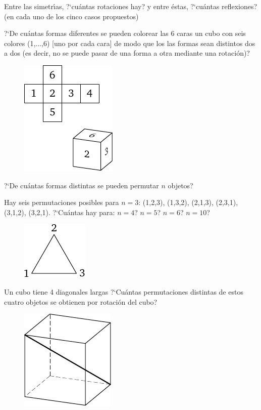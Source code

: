 \documentclass[12pt]{article}  %
\begin{document}
Entre las simetr\'{\i}as, ?`cu\'antas rotaciones hay? y entre \'estas, ?`cu\'antas reflexiones? (en cada uno de los cinco casos propuestos)

 ?`De cu\'antas formas diferentes se pueden colorear las 6 caras un cubo con seis colores (1,...,6) [uno por cada cara]
de modo que los las formas sean distintos dos a dos (es decir, no se puede pasar de una forma a otra mediante una rotaci\'on)? 
\begin{figure}[h]
\centering
\includegraphics{taskbook-17}
\end{figure}


 ?`De cu\'antas formas distintas se pueden permutar $n$ objetos?

Hay seis permutaciones posibles para $n=3$: (1,2,3), (1,3,2), (2,1,3), (2,3,1), (3,1,2), (3,2,1). ?`Cu\'antas hay para: $n=4$? $n=5$? $n=6$? $n=10$?
\begin{figure}[h]
\centering
\includegraphics{taskbook-18}
\end{figure}

 Un cubo tiene 4 diagonales largas ?`Cu\'antas permutaciones distintas de estos cuatro objetos se obtienen por rotaci\'on del cubo?
\begin{figure}[h]
\centering
\includegraphics{taskbook-19}
\end{figure}
\end{document}
